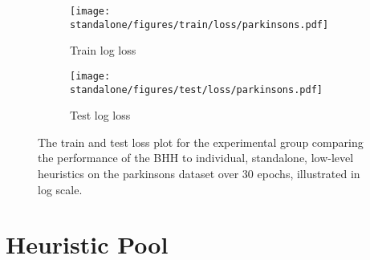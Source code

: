 \begin{figure}[htbp]
	\begin{subfigure}{0.5\textwidth}
		\centering
		\texttt{[image: standalone/figures/train/loss/parkinsons.pdf]}
		\caption{Train log loss}
		\label{fig:results:standalone:figures:loss:train:parkinsons}
	\end{subfigure}
	\begin{subfigure}{0.5\textwidth}
		\centering
		\texttt{[image: standalone/figures/test/loss/parkinsons.pdf]}
		\caption{Test log loss}
		\label{fig:results:standalone:figures:loss:test:parkinsons}
	\end{subfigure}
	\par\bigskip
	\caption{The train and test loss plot for the experimental group comparing the performance of the \acs{BHH} to individual, standalone, low-level heuristics on the parkinsons dataset over 30 epochs, illustrated in log scale.}
	\label{fig:results:standalone:figures:parkinsons}
\end{figure}




\section{Heuristic Pool}\label{sec:results:heuristic_pool}

